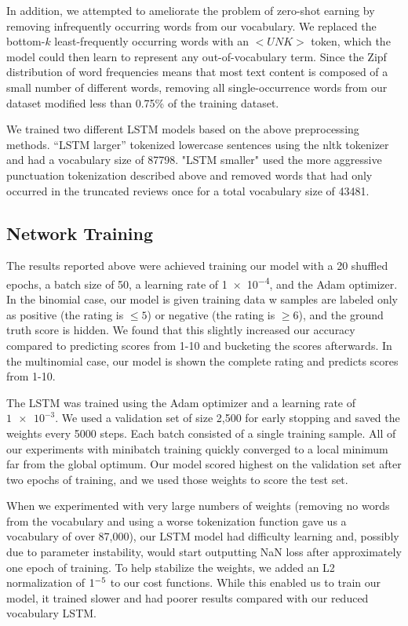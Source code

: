 \documentclass[conference]{IEEEtran}
\begin{document}
    In addition, we attempted to ameliorate the problem of zero-shot earning by removing
    infrequently occurring words from our vocabulary. We replaced the bottom-$k$
    least-frequently occurring words with an $<UNK>$ token, which the model could then
    learn to represent any out-of-vocabulary term. Since the Zipf distribution of word frequencies
    means that most text content is composed of a small number of different words, removing all
    single-occurrence words from our dataset modified less than 0.75\% of the training dataset.

    We trained two different LSTM models based on the above preprocessing methods.
    ``LSTM larger'' tokenized lowercase sentences using the nltk tokenizer and had a
    vocabulary size of 87798. "LSTM smaller" used the more aggressive punctuation tokenization
    described above and removed words that had only occurred in the truncated reviews once
    for a total vocabulary size of 43481.


\subsection{Network Training}
The results reported
    above were achieved training our model with a 20 shuffled epochs, a
    batch size of 50, a learning rate of \num{1e-4}, and the Adam optimizer.
    In the binomial case, our model is given training data w samples are
    labeled only as positive (the rating is $\leq 5$) or negative (the rating is
    $\geq 6$), and the ground truth score is hidden. We found that this slightly
    increased our accuracy compared to predicting scores from 1-10 and
    bucketing the scores afterwards. In the multinomial case, our model is
    shown the complete rating and predicts scores from 1-10.



    The LSTM was trained using the Adam optimizer and a learning rate of $\num{1e-3}$. We used a
    validation set of size 2,500 for early stopping and saved the weights every 5000 steps. Each
    batch consisted of a single training sample. All of our experiments with minibatch training
    quickly converged to a local minimum far from the global optimum. Our model scored highest
    on the validation set after two epochs of training, and we used those weights to score the test set.

    When we experimented with very large numbers of weights (removing no words from the
    vocabulary and using a worse tokenization function gave us a vocabulary of over 87,000),
    our LSTM model had difficulty learning and, possibly due to parameter instability, would start
    outputting NaN loss after approximately one epoch of training. To help stabilize the weights,
    we added an L2 normalization of $1\time10^{-5}$ to our cost functions. While this enabled us
    to train our model, it trained slower and had poorer results compared with our reduced vocabulary
    LSTM.
\end{document}
